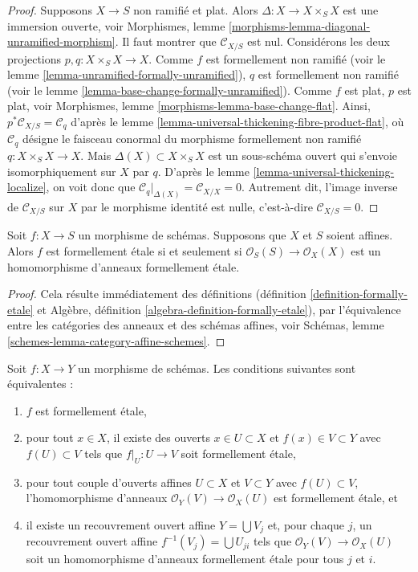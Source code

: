 \begin{proof}
Supposons $X \to S$ non ramifié et plat. Alors $\Delta : X \to X \times_S X$
est une immersion ouverte, voir
Morphismes, lemme \ref{morphisms-lemma-diagonal-unramified-morphism}.
Il faut montrer que $\mathcal{C}_{X/S}$ est nul.
Considérons les deux projections $p, q : X \times_S X \to X$.
Comme $f$ est formellement non ramifié (voir
le lemme \ref{lemma-unramified-formally-unramified}),
$q$ est formellement non ramifié (voir
le lemme \ref{lemma-base-change-formally-unramified}).
Comme $f$ est plat, $p$ est plat, voir
Morphismes, lemme \ref{morphisms-lemma-base-change-flat}.
Ainsi, $p^*\mathcal{C}_{X/S} = \mathcal{C}_q$ d'après
le lemme \ref{lemma-universal-thickening-fibre-product-flat},
où $\mathcal{C}_q$ désigne le faisceau conormal du morphisme formellement
non ramifié $q : X \times_S X \to X$.
Mais $\Delta(X) \subset X \times_S X$ est un sous-schéma ouvert
qui s'envoie isomorphiquement sur $X$ par $q$. D'après
le lemme \ref{lemma-universal-thickening-localize},
on voit donc que $\mathcal{C}_q|_{\Delta(X)} = \mathcal{C}_{X/X} = 0$.
Autrement dit, l'image inverse de $\mathcal{C}_{X/S}$ sur $X$ par
le morphisme identité est nulle, c'est-à-dire $\mathcal{C}_{X/S} = 0$.
\end{proof}

\begin{lemma}
\label{lemma-affine-formally-etale}
Soit $f : X \to S$ un morphisme de schémas.
Supposons que $X$ et $S$ soient affines.
Alors $f$ est formellement étale si et seulement si
$\mathcal{O}_S(S) \to \mathcal{O}_X(X)$ est un homomorphisme d'anneaux
formellement étale.
\end{lemma}

\begin{proof}
Cela résulte immédiatement des définitions
(définition \ref{definition-formally-etale} et
Algèbre, définition \ref{algebra-definition-formally-etale}),
par l'équivalence entre les catégories des anneaux et des schémas affines,
voir
Schémas, lemme \ref{schemes-lemma-category-affine-schemes}.
\end{proof}

\begin{lemma}
\label{lemma-formally-etale}
Soit $f : X \to Y$ un morphisme de schémas. Les conditions suivantes sont équivalentes :
\begin{enumerate}
\item $f$ est formellement étale,
\item pour tout $x \in X$, il existe des ouverts $x \in U \subset X$ et
$f(x) \in V \subset Y$ avec $f(U) \subset V$ tels que
$f|_U : U \to V$ soit formellement étale,
\item pour tout couple d'ouverts affines $U \subset X$ et $V \subset Y$
avec $f(U) \subset V$, l'homomorphisme d'anneaux $\mathcal{O}_Y(V) \to \mathcal{O}_X(U)$
est formellement étale, et
\item il existe un recouvrement ouvert affine $Y = \bigcup V_j$ et,
pour chaque $j$, un recouvrement ouvert affine $f^{-1}(V_j) = \bigcup U_{ji}$
tels que $\mathcal{O}_Y(V) \to \mathcal{O}_X(U)$ soit un homomorphisme d'anneaux
formellement étale pour tous $j$ et $i$.
\end{enumerate}
\end{lemma}

